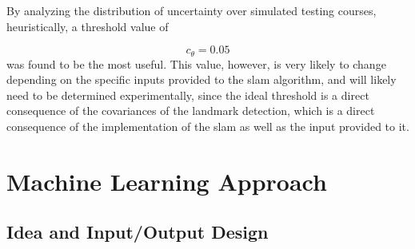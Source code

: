 By analyzing the distribution of uncertainty over simulated testing courses, heuristically, a threshold value of

$$c_\theta = 0.05$$
was found to be the most useful. This value, however, is very likely to change depending on the specific inputs provided to the \ac{slam} algorithm, and will likely need to be determined experimentally, since the ideal threshold is a direct consequence of the covariances of the landmark detection, which is a direct consequence of the implementation of the \ac{slam} as well as the input provided to it.


\section{Machine Learning Approach}
\subsection{Idea and Input/Output Design}
